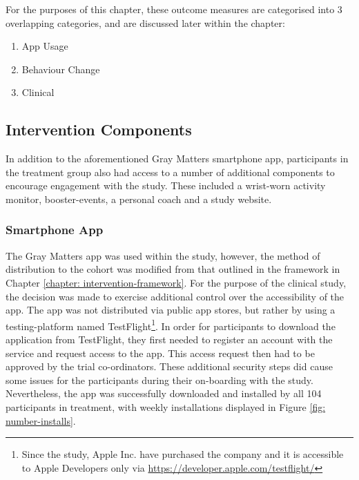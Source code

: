 For the purposes of this chapter, these outcome measures are categorised into 3 overlapping categories, and are discussed later within the chapter:
\begin{enumerate}[noitemsep,topsep=0pt]
	\item App Usage
	\item Behaviour Change
	\item Clinical
\end{enumerate}

\subsection{Intervention Components}
In addition to the aforementioned Gray Matters smartphone app, participants in the treatment group also had access to a number of additional components to encourage engagement with the study. These included a wrist-worn activity monitor, booster-events, a personal coach and a study website.

\subsubsection{Smartphone App}
The Gray Matters app was used within the study, however, the method of distribution to the cohort was modified from that outlined in the framework in Chapter \ref{chapter: intervention-framework}. For the purpose of the clinical study, the decision was made to exercise additional control over the accessibility of the app. The app was not distributed via public app stores, but rather by using a testing-platform named TestFlight\footnote{Since the study, Apple Inc. have purchased the company and it is accessible to Apple Developers only via \url{https://developer.apple.com/testflight/}}. In order for participants to download the application from TestFlight, they first needed to register an account with the service and request access to the app. This access request then had to be approved by the trial co-ordinators. These additional security steps did cause some issues for the participants during their on-boarding with the study. Nevertheless, the app was successfully downloaded and installed by all 104 participants in treatment, with weekly installations displayed in Figure \ref{fig: number-installs}.

